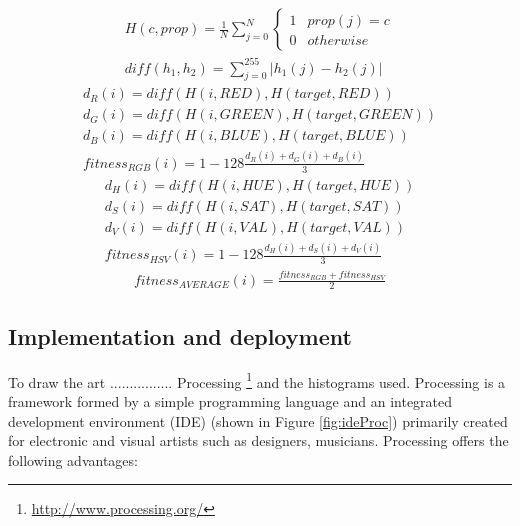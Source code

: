 {\begin{eqnarray}
  \label{eq:histogram}
  H(c, prop) = \frac{1}{N}\sum_{j=0}^N \left\{\begin{matrix}
1 & prop(j) = c\\ 
0 & otherwise
\end{matrix}\right. \\
\label{eq:diff}
diff(h_1, h_2) = \sum_{j=0}^{255} |h_1(j) - h_2(j)|
\end{eqnarray}
\begin{eqnarray}
  d_R(i) = diff(H(i, RED), H(target, RED))\\
  d_G(i) = diff(H(i, GREEN), H(target, GREEN))\\
  d_B(i) =  diff(H(i, BLUE), H(target, BLUE))\\
  \label{eq:RGB}
  fitness_{RGB}(i) = 1 - 128\frac{d_R(i) + d_G(i) + d_B(i)}{3}
\end{eqnarray}
\begin{eqnarray}
  d_H(i) = diff(H(i, HUE), H(target, HUE))\\
  d_S(i) = diff(H(i, SAT), H(target, SAT))\\
  d_V(i) =  diff(H(i, VAL), H(target, VAL))\\
  \label{eq:HSV}
  fitness_{HSV}(i) = 1 - 128\frac{d_H(i) + d_S(i) + d_V(i)}{3}
\end{eqnarray}
\begin{eqnarray}
  \label{eq:AVERAGE}
  fitness_{AVERAGE}(i) = \frac{fitness_{RGB}+fitness_{HSV}}{2}
\end{eqnarray}




\subsection{Implementation and deployment}



To draw the art ................ Processing
\footnote{\url{http://www.processing.org/}} and the histograms
used. %
 Processing \cite{PROCESSING} is a framework formed by a simple
 programming language and an integrated development environment (IDE)
 (shown in Figure \ref{fig:ideProc}) primarily created for electronic
 and visual artists such as designers, musicians. Processing offers
 the following advantages: %

}
